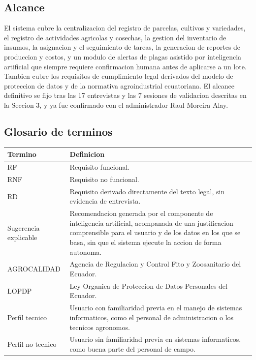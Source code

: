 \documentclass[11pt,a4paper]{article}
\begin{document}
\subsection{Alcance}

El sistema cubre la centralizacion del registro de parcelas, cultivos y variedades, el registro de actividades agricolas y cosechas, la gestion del inventario de insumos, la asignacion y el seguimiento de tareas, la generacion de reportes de produccion y costos, y un modulo de alertas de plagas asistido por inteligencia artificial que siempre requiere confirmacion humana antes de aplicarse a un lote. Tambien cubre los requisitos de cumplimiento legal derivados del modelo de proteccion de datos y de la normativa agroindustrial ecuatoriana. El alcance definitivo se fijo tras las 17 entrevistas y las 7 sesiones de validacion descritas en la Seccion 3, y ya fue confirmado con el administrador Raul Moreira Alay.

\subsection{Glosario de terminos}

\begin{longtable}{L{3.2cm} L{12cm}}
\toprule
\textbf{Termino} & \textbf{Definicion} \\
\midrule
\endhead
RF & Requisito funcional. \\
\addlinespace
RNF & Requisito no funcional. \\
\addlinespace
RD & Requisito derivado directamente del texto legal, sin evidencia de entrevista. \\
\addlinespace
Sugerencia explicable & Recomendacion generada por el componente de inteligencia artificial, acompanada de una justificacion comprensible para el usuario y de los datos en los que se basa, sin que el sistema ejecute la accion de forma autonoma. \\
\addlinespace
AGROCALIDAD & Agencia de Regulacion y Control Fito y Zoosanitario del Ecuador. \\
\addlinespace
LOPDP & Ley Organica de Proteccion de Datos Personales del Ecuador. \\
\addlinespace
Perfil tecnico & Usuario con familiaridad previa en el manejo de sistemas informaticos, como el personal de administracion o los tecnicos agronomos. \\
\addlinespace
Perfil no tecnico & Usuario sin familiaridad previa en sistemas informaticos, como buena parte del personal de campo. \\
\bottomrule
\end{longtable}
\end{document}
